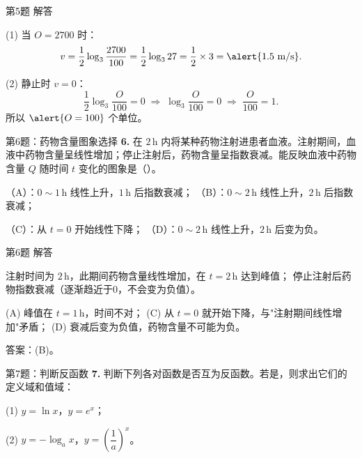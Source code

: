 \documentclass[10pt,aspectratio=169,serif]{beamer}
\begin{document}
\begin{frame}[t]{第5题 解答}
\begin{tcolorbox}[colback=orange!10,colframe=orange,title=\textbf{解}]
(1) 当 $O=2700$ 时：
\[
v = \frac{1}{2}\log_3\frac{2700}{100} = \frac{1}{2}\log_3 27 = \frac{1}{2}\times 3 = \alert{1.5\ \text{m/s}}.
\]

(2) 静止时 $v=0$：
\[
\frac{1}{2}\log_3\frac{O}{100} = 0 \;\Longrightarrow\; \log_3\frac{O}{100} = 0 \;\Longrightarrow\; \frac{O}{100} = 1.
\]
所以 $\alert{O = 100}$ 个单位。
\end{tcolorbox}
\end{frame}

\begin{frame}[t]{第6题：药物含量图象选择}
\textbf{6.} 在 $2$\,h 内将某种药物注射进患者血液。注射期间，血液中药物含量呈线性增加；停止注射后，药物含量呈指数衰减。能反映血液中药物含量 $Q$ 随时间 $t$ 变化的图象是（\quad）。

\vspace{0.5em}
\small（A）：$0\sim 1$\,h 线性上升，$1$\,h 后指数衰减；
（B）：$0\sim 2$\,h 线性上升，$2$\,h 后指数衰减；

\small（C）：从 $t=0$ 开始线性下降；
（D）：$0\sim 2$\,h 线性上升，$2$\,h 后变为负。
\end{frame}

\begin{frame}[t]{第6题 解答}
\begin{tcolorbox}[colback=orange!10,colframe=orange,title=\textbf{解}]
注射时间为 $2$\,h，此期间药物含量\alert{线性增加}，在 $t=2$\,h 达到峰值；
停止注射后药物\alert{指数衰减}（逐渐趋近于0，不会变为负值）。

\vspace{0.5em}
(A) 峰值在 $t=1$\,h，时间不对；
(C) 从 $t=0$ 就开始下降，与"注射期间线性增加"矛盾；
(D) 衰减后变为负值，药物含量不可能为负。

\vspace{0.3em}
\alert{答案：(B)}。
\end{tcolorbox}
\end{frame}

\begin{frame}[t]{第7题：判断反函数}
\textbf{7.} 判断下列各对函数是否互为反函数。若是，则求出它们的定义域和值域：

\vspace{0.8em}
(1) $y = \ln x$，$y = e^x$；

\vspace{0.8em}
(2) $y = -\log_a x$，$y = \left(\dfrac{1}{a}\right)^x$。
\end{frame}
\end{document}
